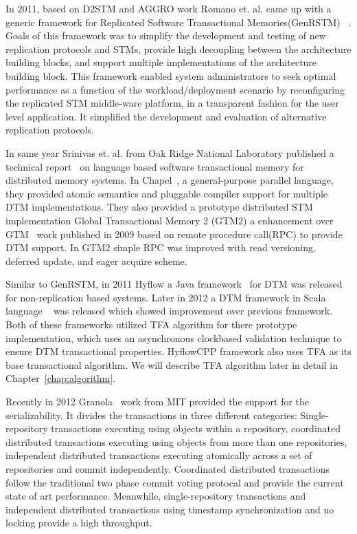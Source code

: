 \documentclass[12pt,english]{report}
\begin{document}
In 2011, based on D2STM and AGGRO work Romano et. al. came up with a generic framework for Replicated Software Transactional Memories(GenRSTM) ~\cite{GenRSTM:6038614}. Goals of this framework was to simplify the development and testing of new replication protocols and STMs, provide high decoupling between the architecture building blocks, and support multiple implementations of the architecture building block. This framework enabled system administrators to seek optimal performance as a function of the workload/deployment scenario by reconfiguring the replicated STM middle-ware platform, in a transparent fashion for the
user level application. It simplified the development and evaluation of alternative replication protocols.

In same year Srinivas et. al. from Oak Ridge National Laboratory published a technical report~\cite{sridharan2011scalable} on language based software transactional memory for distributed memory systems. In Chapel~\cite{chapel:Language}, a general-purpose parallel language, they provided atomic semantics and pluggable compiler support for multiple DTM implementations. They also provided a prototype distributed STM implementation Global Transactional Memory 2 (GTM2) a enhancement over GTM~\cite{sridharan2009scalable} work published in 2009 based on remote procedure call(RPC) to provide DTM  support. In GTM2 simple RPC was improved with read versioning, deferred update, and eager acquire scheme.

Similar to GenRSTM, in 2011 Hyflow a Java framework~\cite{Saad:2011:HHP:1996130.1996167} for DTM was released for non-replication based systems. Later in 2012 a DTM framework in Scala language ~\cite{turcuhyflow2}  was released which showed improvement over previous framework. Both of these frameworks utilized TFA algorithm for there prototype implementation, which uses an asynchronous clockbased validation technique to ensure DTM transactional properties. HyflowCPP framework also uses TFA as its base transactional algorithm. We will describe TFA algorithm later in detail in Chapter~\ref{chap:algorithm}.

Recently in 2012 Granola~\cite{cowling2012granola} work from MIT provided the support for the serializability. It divides the transactions in three different categories: Single-repository transactions executing using objects within a repository, coordinated distributed transactions executing using objects from more than one repositories, independent distributed transactions executing atomically across a set of repositories and commit independently. Coordinated distributed transactions follow the traditional two phase commit voting protocal and provide the current state of art performance. Meanwhile, single-repository transactions and independent distributed transactions using timestamp synchronization and no locking provide a high throughput.   
\end{document}
